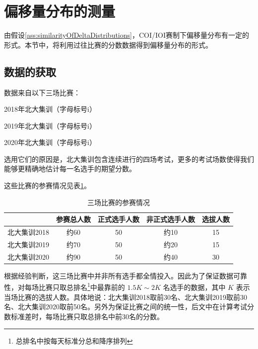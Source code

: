 \section{偏移量分布的测量}

    由假设\ref{ass:similarityOfDeltaDistributions}，COI/IOI赛制下偏移量分布有一定的形式。本节中，将利用过往比赛的分数数据得到偏移量分布的形式。

    \subsection{数据的获取}

        数据来自以下三场比赛：
        \begin{asparaitem}
            \item 2018年北大集训（字母标号i）
            \item 2019年北大集训（字母标号i）
            \item 2020年北大集训（字母标号i）
        \end{asparaitem}

        选用它们的原因是，北大集训包含连续进行的四场考试，更多的考试场数使得我们能够更精确地估计每一名选手的期望分数。

        这些比赛的参赛情况见表\ref{tab:ctt18to20}。

        \begin{table}\footnotesize
            \centering
            \begin{tabular}{@{}lcccc@{}}
            \toprule
             & \multicolumn{1}{l}{参赛总人数} & \multicolumn{1}{l}{正式选手人数} & \multicolumn{1}{l}{非正式选手人数} & \multicolumn{1}{l}{选拔人数} \\ \midrule
            北大集训2018 & 约60 & 50 & 约10 & 15 \\
            北大集训2019 & 约70 & 50 & 约20 & 15 \\
            北大集训2020 & 约90 & 50 & 约40 & 30 \\ \bottomrule
            \end{tabular}
            \caption{三场比赛的参赛情况}
            \label{tab:ctt18to20}
        \end{table}

        根据经验判断，这三场比赛中并非所有选手都全情投入。因此为了保证数据可靠性，对每场比赛只取总排名\footnote{总排名中按每天标准分总和降序排列}中最靠前的 $1.5K\sim 2K$ 名选手的数据，其中 $K$ 表示当场比赛的选拔人数。具体地说：北大集训2018取前30名、北大集训2019取前30名、北大集训2020取前50名。另外为保证比赛之间的统一性，后文中在计算考试分数标准差时，每场比赛只取总排名中前30名的分数。

